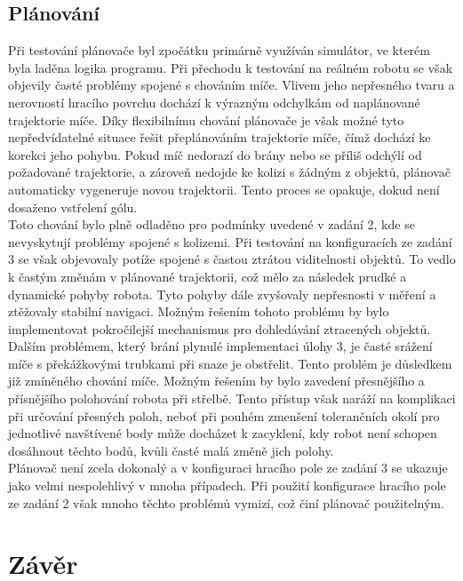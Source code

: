 \documentclass[a4paper,12pt]{article}
\begin{document}
\subsection{Plánování}
Při testování plánovače byl zpočátku primárně využíván simulátor, ve kterém byla laděna logika programu. Při přechodu k testování na reálném robotu se však objevily časté problémy spojené s chováním míče. Vlivem jeho nepřesného tvaru a nerovností hracího povrchu dochází k výrazným odchylkám od naplánované trajektorie míče. Díky flexibilnímu chování plánovače je však možné tyto nepředvídatelné situace řešit přeplánováním trajektorie míče, čímž dochází ke korekci jeho pohybu. Pokud míč nedorazí do brány nebo se příliš odchýlí od požadované trajektorie, a zároveň nedojde ke kolizi s žádným z objektů, plánovač automaticky vygeneruje novou trajektorii. Tento proces se opakuje, dokud není dosaženo vstřelení gólu.\\
Toto chování bylo plně odladěno pro podmínky uvedené v zadání 2, kde se nevyskytují problémy spojené s kolizemi. Při testování na konfiguracích ze zadání 3 se však objevovaly potíže spojené s častou ztrátou viditelnosti objektů. To vedlo k častým změnám v plánované trajektorii, což mělo za následek prudké a dynamické pohyby robota. Tyto pohyby dále zvyšovaly nepřesnosti v měření a ztěžovaly stabilní navigaci. Možným řešením tohoto problému by bylo implementovat pokročilejší mechanismus pro dohledávání ztracených objektů.\\
Dalším problémem, který brání plynulé implementaci úlohy 3, je časté srážení míče s překážkovými trubkami při snaze je obstřelit. Tento problém je důsledkem již zmíněného chování míče. Možným řešením by bylo zavedení přesnějšího a přísnějšího polohování robota při střelbě. Tento přístup však naráží na komplikaci při určování přesných poloh, neboť při pouhém zmenšení tolerančních okolí pro jednotlivé navštívené body může docházet k zacyklení, kdy robot není schopen dosáhnout těchto bodů, kvůli časté malá změně jich polohy.\\
Plánovač není zcela dokonalý a v konfiguraci hracího pole ze zadání 3 se ukazuje jako velmi nespolehlivý v mnoha případech. Při použití konfigurace hracího pole ze zadání 2 však mnoho těchto problémů vymizí, což činí plánovač použitelným.



\section{Závěr}
\end{document}
